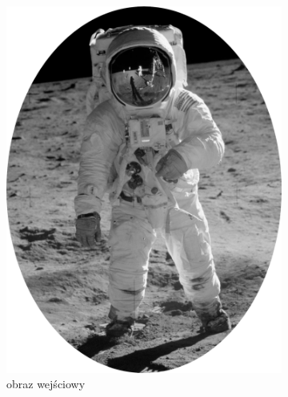     	\begin{figure}[H] 
        \centering
        \begin{subfigure}{0.24\textwidth}
            \centering
            \includegraphics[width = \textwidth]{img/6-comp/aldrin_original_c10_inv0.png}
            \caption{obraz wejściowy\\\hphantom{ }\\\hphantom{ }\\\hphantom{ }}
            \label{comp-comp-aldrin-a}
        \end{subfigure}
        \begin{subfigure}{0.24\textwidth}
            \centering

\end{subfigure}
\end{figure}
